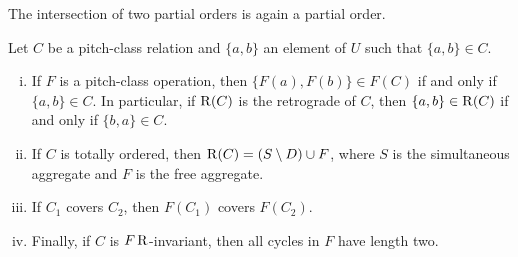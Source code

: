\begin{theorem}
    \cite[194]{Starr1984}
    The intersection of two partial orders is again a partial order.
\end{theorem}

\begin{theorem}
    \cite[195]{Starr1984}
    \label{starr-theorem-operations}
    Let $C$ be a pitch-class relation and $\{ a, b \}$ an element of $U$ such that $\{ a, b \} \in C$.
    \begin{enumerate}[i.]
        \item If $F$ is a pitch-class operation, then $\{ F(a), F(b) \} \in F(C)$ if and only if $\{ a, b \} \in C$. In particular, if $\operatorname{R}(C)$ is the retrograde of $C$, then $\{ a, b \} \in \operatorname{R}(C)$ if and only if $\{ b, a \} \in C$.
        \item If $C$ is totally ordered, then $\operatorname{R}(C) = (S \setminus D) \cup F$, where $S$ is the simultaneous aggregate and $F$ is the free aggregate.
        \item If $C_1$ covers $C_2$, then $F(C_1)$ covers $F(C_2)$.
        \item Finally, if $C$ is $F\operatorname{R}$-invariant, then all cycles in $F$ have length two.
    \end{enumerate}
\end{theorem}

